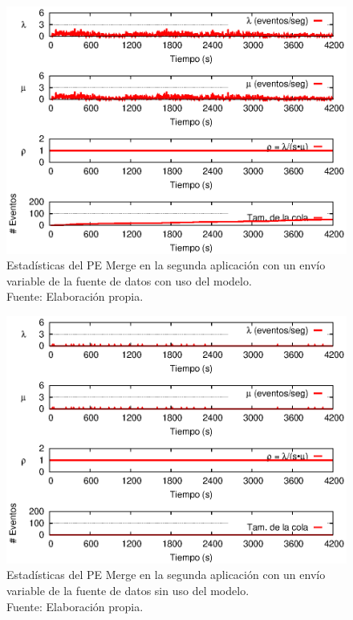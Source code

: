 \begin{figure}[!ht]
    \centering
    \captionsetup{justification=centering}
    \includegraphics[scale=1]{images/exp/app2/normal/cm/statusMergePE.eps}
    \caption[Estadísticas del PE Merge en la segunda aplicación con un envío variable de la fuente de datos con uso del modelo.]{Estadísticas del PE Merge en la segunda aplicación con un envío variable de la fuente de datos con uso del modelo.\\Fuente: Elaboración propia.}
    \label{fig:app2-normal-statusMergePE-cm}
\end{figure}

\begin{figure}[!ht]
    \centering
    \captionsetup{justification=centering}
    \includegraphics[scale=1]{images/exp/app2/normal/sm/statusMergePE.eps}
    \caption[Estadísticas del PE Merge en la segunda aplicación con un envío variable de la fuente de datos sin uso del modelo.]{Estadísticas del PE Merge en la segunda aplicación con un envío variable de la fuente de datos sin uso del modelo.\\Fuente: Elaboración propia.}
    \label{fig:app2-normal-statusMergePE-sm}
\end{figure}


